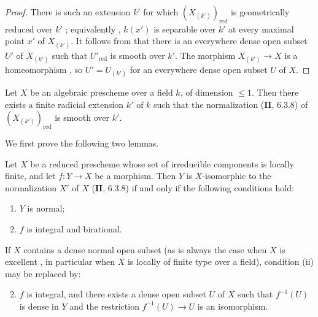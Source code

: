 \begin{proof}
There is such an extension $k'$ for which $(X_{(k')})_{\mathrm{red}}$ is geometrically reduced over $k'$ ; equivalently , $k(x')$ is separable over $k'$ at every maximal point $x'$ of $X_{(k')}$.  It follows from  that there is an everywhere dense open subset $U'$ of $X_{(k')}$ such that $U'_{\mathrm{red}}$ is smooth over $k'$.  The morphism $X_{(k')}\to X$ is a homeomorphism , so $U'=U_{(k')}$ for an everywhere dense open subset $U$ of $X$.
\end{proof}

\begin{proposition}[17.15.14]
\label{IV.17.15.14}
Let $X$ be an algebraic prescheme over a field $k$, of dimension $\leq 1$.
Then there exists a finite radicial extension $k'$ of $k$ such that the normalization ($\mathbf{II}$, 6.3.8) of $(X_{(k')})_{\mathrm{red}}$ is smooth over $k'$.
\end{proposition}

We first prove the following two lemmas.

\begin{lemma}[17.15.14.1]
\label{IV.17.15.14.1}
Let $X$ be a reduced prescheme whose set of irreducible components is locally finite, and let $f:Y\to X$ be a morphism.  Then $Y$ is $X$-isomorphic to the normalization $X'$ of $X$ ($\mathbf{II}$, 6.3.8) if and only if the following conditions hold:
\begin{enumerate}[label=(\roman*)]
 \item $Y$ is normal;
 \item $f$ is integral and birational.
\end{enumerate}
If $X$ contains a dense normal open subset (as is always the case when $X$ is excellent , in particular when $X$ is locally of finite type over a field), condition (ii) may be replaced by:
\begin{enumerate}[label=(\roman* bis)]
 \setcounter{enumi}{1}
 \item $f$ is integral, and there exists a dense open subset $U$ of $X$ such that $f^{-1}(U)$ is dense in $Y$ and the restriction $f^{-1}(U)\to U$ is an isomorphism.
\end{enumerate}
\end{lemma}

